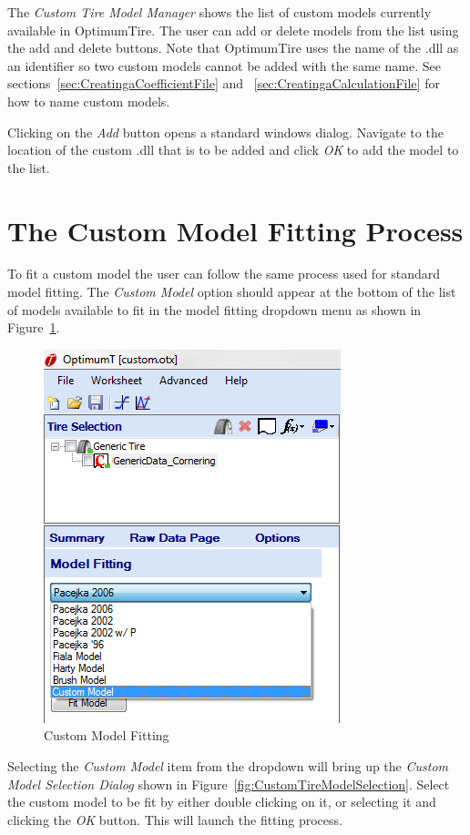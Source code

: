 The \textsl{Custom Tire Model Manager} shows the list of custom models currently available in OptimumTire. The user can add or delete models from the list using the add and delete buttons. Note that OptimumTire uses the name of the .dll as an identifier so two custom models cannot be added with the same name. See sections~\ref{sec:CreatingaCoefficientFile} and ~\ref{sec:CreatingaCalculationFile} for how to name custom models.

Clicking on the \textsl{Add} button opens a standard windows dialog. Navigate to the location of the custom .dll that is to be added and click \textsl{OK} to add the model to the list.

\section{The Custom Model Fitting Process}
\label{sec:The CustomModelFittingProcess}

To fit a custom model the user can follow the same process used for standard model fitting. The \textsl{Custom Model} option should appear at the bottom of the list of models available to fit in the model fitting dropdown menu as shown in Figure~\ref{fig:CustomModelFitting}.

 \begin{figure}[H]
	\centering
		\includegraphics{CustomFitting.png}
	\caption{Custom Model Fitting}
	\label{fig:CustomModelFitting}
\end{figure}

Selecting the \textsl{Custom Model} item from the dropdown will bring up the \textsl{Custom Model Selection Dialog} shown in Figure~\ref{fig:CustomTireModelSelection}. Select the custom model to be fit by either double clicking on it, or selecting it and clicking the \textsl{OK} button. This will launch the fitting process.

